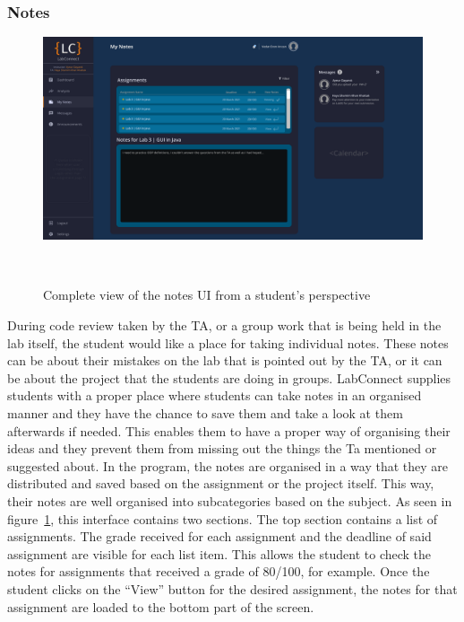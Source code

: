 \documentclass[a4paper, 12pt]{article}
\begin{document}
    \subsubsection{Notes}
    
    \begin{figure}[H]
        \centering
        \includegraphics[width=\textwidth]{student_notes}
        \caption{Complete view of the notes UI from a student's perspective}~\label{fig:student_notes_full}
    \end{figure}

    During code review taken by the TA, or a group work that is being held in the lab itself,
    the student would like a place for taking individual notes. These notes can be about their
    mistakes on the lab that is pointed out by the TA, or it can be about the project that the 
    students are doing in groups. LabConnect supplies students with a proper place where students
    can take notes in an organised manner and they have the chance to save them and take a look
    at them afterwards if needed. This enables them to have a proper way of organising their ideas
    and they prevent them from missing out the things the Ta mentioned or suggested about. In the
    program, the notes are organised in a way that they are distributed and saved based on the 
    assignment or the project itself. This way, their notes are well organised into subcategories
    based on the subject. As seen in figure~\ref{fig:student_notes_full}, this interface contains
    two sections. The top section contains a list of assignments. The grade received for each
    assignment and the deadline of said assignment are visible for each list item. This allows the
    student to check the notes for assignments that received a grade of 80/100, for example. Once
    the student clicks on the ``View'' button for the desired assignment, the notes for that assignment
    are loaded to the bottom part of the screen.
\end{document}
